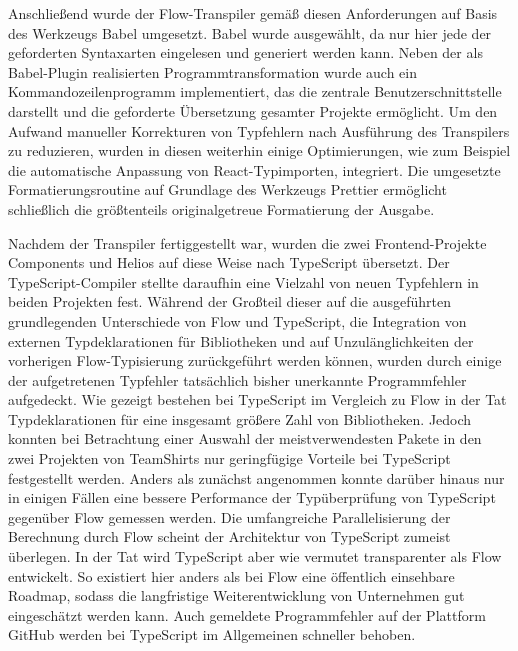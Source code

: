 Anschließend wurde der Flow-Transpiler gemäß diesen Anforderungen auf Basis des Werkzeugs Babel umgesetzt. Babel wurde ausgewählt, da nur hier jede der geforderten Syntaxarten eingelesen und generiert werden kann. Neben der als Babel-Plugin realisierten Programmtransformation wurde auch ein Kommandozeilenprogramm implementiert, das die zentrale Benutzerschnittstelle darstellt und die geforderte Übersetzung gesamter Projekte ermöglicht. Um den Aufwand manueller Korrekturen von Typfehlern nach Ausführung des Transpilers zu reduzieren, wurden in diesen weiterhin einige Optimierungen, wie zum Beispiel die automatische Anpassung von React-Typimporten, integriert. Die umgesetzte Formatierungsroutine auf Grundlage des Werkzeugs Prettier ermöglicht schließlich die größtenteils originalgetreue Formatierung der Ausgabe.

Nachdem der Transpiler fertiggestellt war, wurden die zwei Frontend-Projekte Components und Helios auf diese Weise nach TypeScript übersetzt. Der TypeScript-Compiler stellte daraufhin eine Vielzahl von neuen Typfehlern in beiden Projekten fest. Während der Großteil dieser auf die ausgeführten  grundlegenden Unterschiede von Flow und TypeScript, die Integration von externen Typdeklarationen für Bibliotheken und auf Unzulänglichkeiten der vorherigen Flow-Typisierung zurückgeführt werden können, wurden durch einige der aufgetretenen Typfehler tatsächlich bisher unerkannte Programmfehler aufgedeckt. Wie gezeigt bestehen bei TypeScript im Vergleich zu Flow in der Tat Typdeklarationen für eine insgesamt größere Zahl von Bibliotheken. Jedoch konnten bei Betrachtung einer Auswahl der meistverwendesten Pakete in den zwei Projekten von TeamShirts nur geringfügige Vorteile bei TypeScript festgestellt werden. Anders als zunächst angenommen konnte darüber hinaus nur in einigen Fällen eine bessere Performance der Typüberprüfung von TypeScript gegenüber Flow gemessen werden. Die umfangreiche Parallelisierung der Berechnung durch Flow scheint der Architektur von TypeScript zumeist überlegen. In der Tat wird TypeScript aber wie vermutet transparenter als Flow entwickelt. So existiert hier anders als bei Flow eine öffentlich einsehbare Roadmap, sodass die langfristige Weiterentwicklung von Unternehmen gut eingeschätzt werden kann. Auch gemeldete Programmfehler auf der Plattform GitHub werden bei TypeScript im Allgemeinen schneller behoben.


